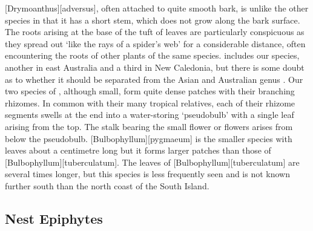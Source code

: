 [Drymoanthus][adversus], often attached to quite smooth bark, is unlike the other species in that it has a short stem, which does not grow along the bark surface.
The roots arising at the base of the tuft of leaves are particularly conspicuous as they spread out `like the rays of a spider's web' for a considerable distance, often encountering the roots of other plants of the same species.  includes our species, another in east Australia and a third in New Caledonia, but there is some doubt as to whether it should be separated from the Asian and Australian genus .
Our two species of , although small, form quite dense patches with their branching rhizomes.
In common with their many tropical relatives, each of their rhizome segments swells at the end into a water-storing `pseudobulb' with a single leaf arising from the top.
The stalk bearing the small flower or flowers arises from below the pseudobulb. [Bulbophyllum][pygmaeum] is the smaller species with leaves about a centimetre long but it forms larger patches than those of [Bulbophyllum][tuberculatum].
The leaves of [Bulbophyllum][tuberculatum] are several times longer, but this species is less frequently seen and is not known further south than the north coast of the South Island.

\subsection{Nest Epiphytes}

